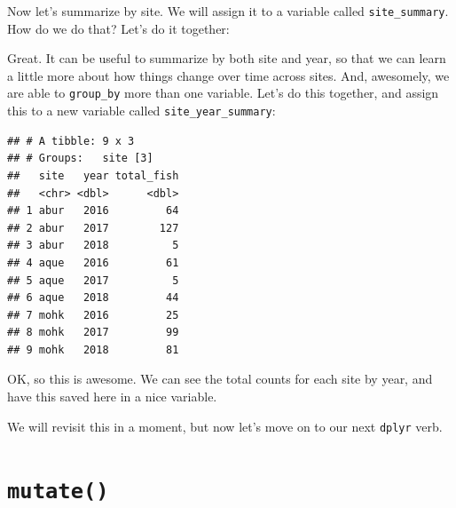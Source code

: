 \documentclass[]{book}
\newenvironment{Shaded}{\begin{snugshade}}{\end{snugshade}}
\newcommand{\DataTypeTok}[1]{\textcolor[rgb]{0.13,0.29,0.53}{#1}}
\newcommand{\KeywordTok}[1]{\textcolor[rgb]{0.13,0.29,0.53}{\textbf{#1}}}
\newcommand{\NormalTok}[1]{#1}
\newcommand{\OperatorTok}[1]{\textcolor[rgb]{0.81,0.36,0.00}{\textbf{#1}}}
\newcommand{\StringTok}[1]{\textcolor[rgb]{0.31,0.60,0.02}{#1}}
\begin{document}
Now let's summarize by site. We will assign it to a variable called \texttt{site\_summary}. How do we do that? Let's do it together:

\begin{Shaded}
\end{Shaded}

Great. It can be useful to summarize by both site and year, so that we can learn a little more about how things change over time across sites. And, awesomely, we are able to \texttt{group\_by} more than one variable. Let's do this together, and assign this to a new variable called \texttt{site\_year\_summary}:

\begin{Shaded}
\end{Shaded}

\begin{verbatim}
## # A tibble: 9 x 3
## # Groups:   site [3]
##   site   year total_fish
##   <chr> <dbl>      <dbl>
## 1 abur   2016         64
## 2 abur   2017        127
## 3 abur   2018          5
## 4 aque   2016         61
## 5 aque   2017          5
## 6 aque   2018         44
## 7 mohk   2016         25
## 8 mohk   2017         99
## 9 mohk   2018         81
\end{verbatim}

OK, so this is awesome. We can see the total counts for each site by year, and have this saved here in a nice variable.

We will revisit this in a moment, but now let's move on to our next \texttt{dplyr} verb.

\hypertarget{mutate}{%
\section{\texorpdfstring{\texttt{mutate()}}{mutate()}}\label{mutate}}
\end{document}
